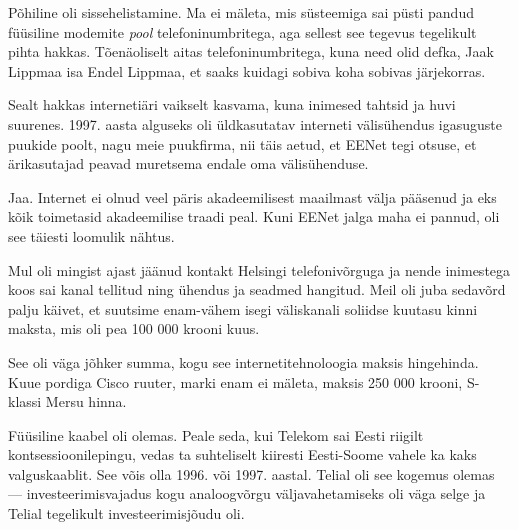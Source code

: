 
Põhiline oli sissehelistamine. Ma ei mäleta, mis süsteemiga sai 
püsti pandud füüsiline modemite \emph{pool} telefoninumbritega, aga sellest see 
tegevus tegelikult pihta hakkas. Tõenäoliselt aitas telefoninumbritega, kuna need 
olid defka, Jaak Lippmaa isa Endel 
Lippmaa, et saaks kuidagi sobiva 
koha sobivas järjekorras.

Sealt hakkas internetiäri vaikselt kasvama, kuna inimesed tahtsid ja huvi 
suurenes. 1997. aasta alguseks oli 
üldkasutatav interneti välisühendus igasuguste puukide poolt, nagu meie 
puukfirma, nii täis aetud, et EENet tegi otsuse, et
ärikasutajad peavad muretsema endale oma välisühenduse.


Jaa. Internet ei olnud veel päris akadeemilisest maailmast välja pääsenud ja 
eks kõik toimetasid akadeemilise traadi peal. Kuni EENet jalga 
maha ei pannud, oli see täiesti loomulik nähtus. 


Mul oli mingist ajast jäänud kontakt Helsingi telefonivõrguga ja nende 
inimestega koos sai kanal tellitud ning ühendus ja seadmed hangitud. Meil oli 
juba sedavõrd palju käivet, et suutsime enam-vähem isegi väliskanali soliidse
kuutasu kinni maksta, mis oli pea 100 000 krooni kuus. 


See oli väga jõhker summa, kogu see internetitehnoloogia maksis hingehinda. Kuue 
pordiga Cisco ruuter, marki enam ei mäleta, maksis 250 000 krooni, S-klassi Mersu hinna.


Füüsiline kaabel oli olemas. Peale seda, kui Telekom sai 
Eesti riigilt kontsessioonilepingu, vedas ta suhteliselt kiiresti Eesti-Soome 
vahele ka kaks valguskaablit. See võis olla 1996. või 1997. aastal. 
Telial oli see kogemus olemas --- investeerimisvajadus kogu
analoogvõrgu väljavahetamiseks oli väga selge ja Telial tegelikult 
investeerimisjõudu oli. 

